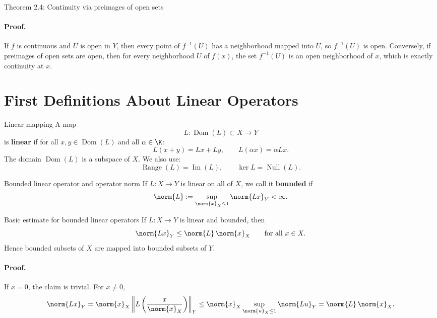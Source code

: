 \documentclass[11pt]{article}
\begin{document}
\begin{thmbox}{Theorem 2.4: Continuity via preimages of open sets}
\thmContinuityPreimages
\end{thmbox}

\paragraph{Proof.}
If $f$ is continuous and $U$ is open in $Y$, then every point of $f^{-1}(U)$ has a neighborhood mapped into $U$, so $f^{-1}(U)$ is open. Conversely, if preimages of open sets are open, then for every neighborhood $U$ of $f(x)$, the set $f^{-1}(U)$ is an open neighborhood of $x$, which is exactly continuity at $x$.

\section{First Definitions About Linear Operators}

\begin{defbox}{Linear mapping}
A map
\[
L:\operatorname{Dom}(L)\subset X\to Y
\]
is \textbf{linear} if for all $x,y\in \operatorname{Dom}(L)$ and all $\alpha\in\K$:
\[
L(x+y)=Lx+Ly,
\qquad
L(\alpha x)=\alpha Lx.
\]
The domain $\operatorname{Dom}(L)$ is a subspace of $X$. We also use:
\[
\operatorname{Range}(L)=\operatorname{Im}(L),
\qquad
\ker L=\operatorname{Null}(L).
\]
\end{defbox}

\begin{defbox}{Bounded linear operator and operator norm}
If $L:X\to Y$ is linear on all of $X$, we call it \textbf{bounded} if
\[
\norm{L}:=\sup_{\norm{x}_X\le 1}\norm{Lx}_Y<\infty.
\]
\end{defbox}

\begin{thmbox}{Basic estimate for bounded linear operators}
If $L:X\to Y$ is linear and bounded, then
\[
\norm{Lx}_Y\le \norm{L}\,\norm{x}_X
\qquad\text{for all }x\in X.
\]
Hence bounded subsets of $X$ are mapped into bounded subsets of $Y$.
\end{thmbox}

\paragraph{Proof.}
If $x=0$, the claim is trivial. For $x\neq 0$,
\[
\norm{Lx}_Y
=\norm{x}_X\left\|L\left(\frac{x}{\norm{x}_X}\right)\right\|_Y
\le \norm{x}_X \sup_{\norm{u}_X\le 1}\norm{Lu}_Y
=\norm{L}\,\norm{x}_X.
\]
\end{document}
